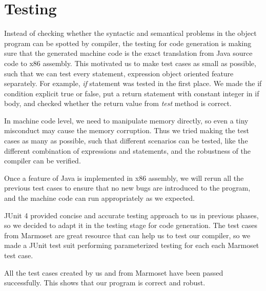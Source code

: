 \chapter{Testing}
\label{testing}
Instead of checking whether the syntactic and semantical problems in the object program can be spotted by compiler, the testing for code generation is making sure that the generated machine code is the exact translation from Java source code to x86 assembly. This motivated us to make test cases as small as possible, such that we can test every statement, expression object oriented feature separately. For example, \textit{if} statement was tested in the first place. We made the if condition explicit true or false, put a return statement with constant integer in if body, and checked whether the return value from \textit{test} method is correct.

In machine code level, we need to manipulate memory directly, so even a tiny misconduct may cause the memory corruption. Thus we tried making the test cases as many as possible, such that different scenarios can be tested, like the different combination of expressions and statements, and the robustness of the compiler can be verified.     

Once a feature of Java is implemented in x86 assembly, we will rerun all the previous test cases to ensure that no new bugs are introduced to the program, and the machine code can run appropriately as we expected. 

JUnit 4 provided concise and accurate testing approach to us in previous phases, so we decided to adapt it in the testing stage for code generation. The test cases from Marmoset are great resource that can help us to test our compiler, so we made a JUnit test suit performing parameterized testing for each each Marmoset test case.

All the test cases created by us and from Marmoset have been passed successfully. This shows that our program is correct and robust. 